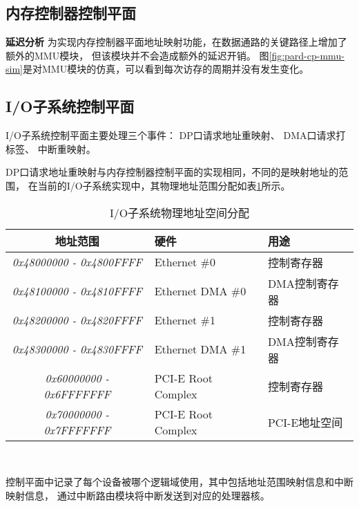 \subsection{内存控制器控制平面}
\label{chap:impl:migcp}

\textbf{延迟分析}\quad
为实现内存控制器平面地址映射功能，在数据通路的关键路径上增加了额外的MMU模块，
但该模块并不会造成额外的延迟开销。
图\ref{fig:pard-cp-mmu-sim}是对MMU模块的仿真，可以看到每次访存的周期并没有发生变化。


\subsection{I/O子系统控制平面}
\label{chap:impl:iocp}

I/O子系统控制平面主要处理三个事件：
DP口请求地址重映射、
DMA口请求打标签、
中断重映射。

DP口请求地址重映射与内存控制器控制平面的实现相同，不同的是映射地址的范围，
在当前的I/O子系统实现中，其物理地址范围分配如表\ref{tab:pard-io-phyaddr}所示。

\begin{table}[htb]
  \centering
  \begin{minipage}[t]{0.8\linewidth}
  \caption{I/O子系统物理地址空间分配}
  \label{tab:pard-io-phyaddr}
    \begin{tabular*}{\linewidth}{cll}
      \toprule[1.5pt]
      \textbf{地址范围} & \textbf{硬件} & \textbf{用途} \\
      \midrule[1pt]
      \textit{0x48000000 - 0x4800FFFF} & Ethernet \#0       & 控制寄存器    \\
      \textit{0x48100000 - 0x4810FFFF} & Ethernet DMA \#0   & DMA控制寄存器 \\
      \textit{0x48200000 - 0x4820FFFF} & Ethernet \#1       & 控制寄存器    \\
      \textit{0x48300000 - 0x4830FFFF} & Ethernet DMA \#1   & DMA控制寄存器 \\
      \textit{0x60000000 - 0x6FFFFFFF} & PCI-E Root Complex & 控制寄存器    \\
      \textit{0x70000000 - 0x7FFFFFFF} & PCI-E Root Complex & PCI-E地址空间 \\
      \bottomrule[1.5pt]
    \end{tabular*}\\[2pt]
  \end{minipage}
\end{table}

控制平面中记录了每个设备被哪个逻辑域使用，其中包括地址范围映射信息和中断映射信息，
通过中断路由模块将中断发送到对应的处理器核。


